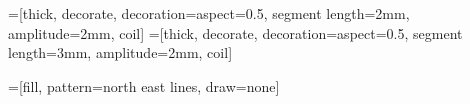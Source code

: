 
=[thick, decorate, decoration={aspect=0.5, segment length=2mm, amplitude=2mm, coil}]
=[thick, decorate, decoration={aspect=0.5, segment length=3mm, amplitude=2mm, coil}]

=[fill, pattern=north east lines, draw=none]


\def\ph{0.25}       %

